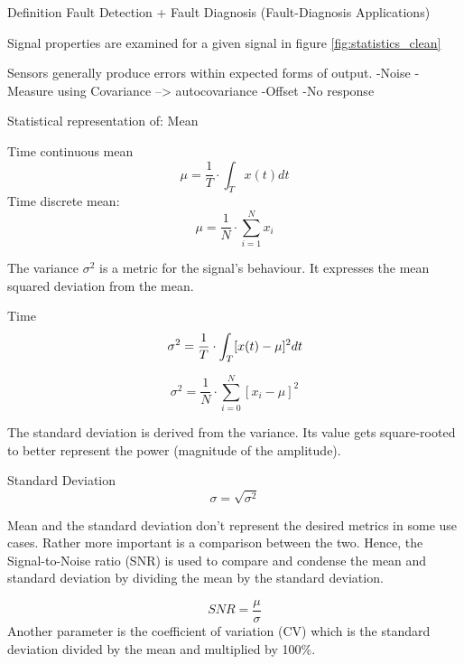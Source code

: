 Definition Fault Detection + Fault Diagnosis (Fault-Diagnosis Applications)


Signal properties are examined for a given signal in figure \ref{fig:statistics_clean}





Sensors generally produce errors within expected forms of output.
-Noise
-Measure using Covariance --> autocovariance
-Offset
-No response

Statistical representation of:
Mean

\cite[S.13-17]{smith_scientist_nodate}

Time continuous mean
\begin{equation}
    \label{eq:mean_cont}
    \mu=\frac{1}{T} \cdot \int_T x(t) d t
\end{equation}
Time discrete mean:
\begin{equation}
    \label{eq:mean_disc}
    \mu=\frac{1}{N} \cdot \sum_{i=1}^{N} x_i
\end{equation}




The variance $\sigma^2$ is a metric for the signal's behaviour. It expresses the mean squared deviation from the mean.

Time
\begin{equation}
    \label{eq:var_cont}
    \sigma^2=\frac{1}{T} \cdot \int_T[x(t)-\mu]^2 d t\\
\end{equation}

\begin{equation}
    \label{eq:var_disc}
    \sigma^2=\frac{1}{N} \cdot \sum_{i=0}^{N}\left[x_i-\mu\right]^2
\end{equation}

The standard deviation is derived from the variance. Its value gets square-rooted to better represent the power (magnitude of the amplitude).

Standard Deviation
\begin{equation}
    \label{eq:stdev_disc}
    \sigma = \sqrt{\sigma^2}
\end{equation}

Mean and the standard deviation don't represent the desired metrics in some use cases. Rather more important is a comparison between the two. Hence, the Signal-to-Noise ratio (SNR) is used to compare and condense the mean and standard deviation by dividing the mean by the standard deviation.

\begin{equation}
    \label{eq:snr}
    SNR=\frac{\mu}{\sigma}
\end{equation}
Another parameter is the coefficient of variation (CV) which is the standard deviation divided by the mean and multiplied by 100\%.


